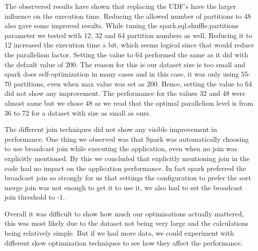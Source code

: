 The observered results have shown that replacing the UDF's have the larger influence on the execution time. Reducing the allowed number of partitions to 48 also gave some improved results. While tuning the spark.sql.shuffle.partitions parameter we tested with 12, 32 and 64 partition numbers as well. Reducing it to 12 increased the execution time a bit, which seems logical since that would reduce the parallelism factor. Setting the value to 64 performed the same as it did with the default value of 200. The reason for this is our dataset size is too small and spark does self-optimization in many cases and in this case, it was only using 55-70 partitions, even when max value was set as 200. Hence, setting the value to 64 did not show any improvement. The performance for the values 32 and 48 were almost same but we chose 48 as we read that the optimal parallelism level is from 36 to 72 for a dataset with size as small as ours.\cite{tuning}

The different join techniques did not show any visible improvement in performance. One thing we observed was that Spark was automatically choosing to use broadcast join while executing the application, even when no join was explicitly mentioned. By this we concluded that explicitly mentioning join in the code had no impact on the application performance. In fact spark preferred the broadcast join so strongly for us that settings the configuration to prefer the sort merge join was not enough to get it to use it, we also had to set the broadcast join threshold to -1.

Overall it was difficult to show how much our optimisations actually mattered, this was most likely due to the dataset not being very large and the calculations being relatively simple. But if we had more data, we could experiment with different skew optimization techniques to see how they affect the performance.

